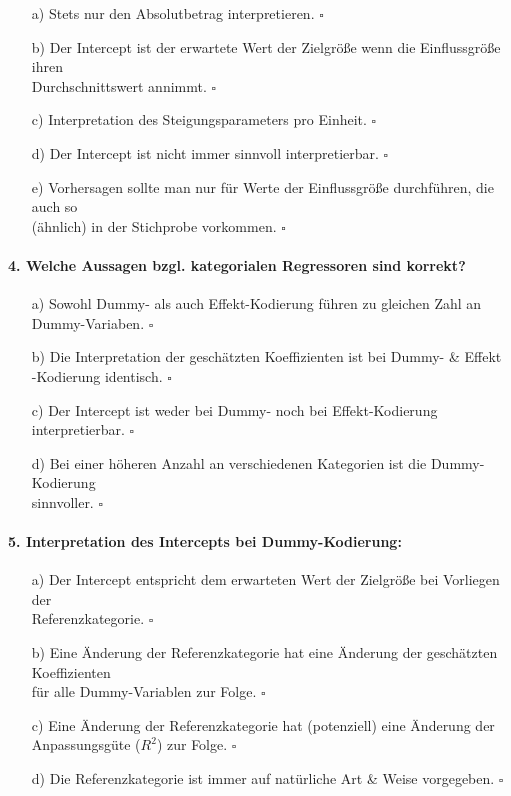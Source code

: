 \documentclass[a4paper]{article}
\begin{document}
\begin{itemize}
    \item[a)] Stets nur den Absolutbetrag interpretieren. \hfill $\square$
    \item[b)] Der Intercept ist der erwartete Wert der Zielgröße wenn die Einflussgröße ihren\\Durchschnittswert annimmt. \hfill $\square$
    \item[c)] Interpretation des Steigungsparameters pro Einheit. \hfill $\square$
    \item[d)] Der Intercept ist nicht immer sinnvoll interpretierbar. \hfill $\square$
    \item[e)] Vorhersagen sollte man nur für Werte der Einflussgröße durchführen, die auch so\\(ähnlich) in der Stichprobe vorkommen. \hfill $\square$
\end{itemize}

\paragraph{4. Welche Aussagen bzgl. kategorialen Regressoren sind korrekt?}

\begin{itemize}
    \item[a)] Sowohl Dummy- als auch Effekt-Kodierung führen zu gleichen Zahl an Dummy-Variaben. \hfill $\square$
    \item[b)] Die Interpretation der geschätzten Koeffizienten ist bei Dummy- \& Effekt\\-Kodierung identisch. \hfill $\square$
    \item[c)] Der Intercept ist weder bei Dummy- noch bei Effekt-Kodierung interpretierbar. \hfill $\square$
    \item[d)] Bei einer höheren Anzahl an verschiedenen Kategorien ist die Dummy-Kodierung\\sinnvoller. \hfill $\square$
\end{itemize}

\paragraph{5. Interpretation des Intercepts bei Dummy-Kodierung:}

\begin{itemize}
    \item[a)] Der Intercept entspricht dem erwarteten Wert der Zielgröße bei Vorliegen der\\Referenzkategorie. \hfill $\square$
    \item[b)] Eine Änderung der Referenzkategorie hat eine Änderung der geschätzten Koeffizienten\\für alle Dummy-Variablen zur Folge. \hfill $\square$
    \item[c)] Eine Änderung der Referenzkategorie hat (potenziell) eine Änderung der\\Anpassungsgüte ($R^2$) zur Folge. \hfill $\square$
    \item[d)] Die Referenzkategorie ist immer auf natürliche Art \& Weise vorgegeben. \hfill $\square$
\end{itemize}
\end{document}
